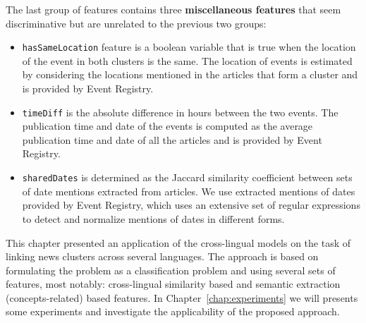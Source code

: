 The last group of features contains three {\bf miscellaneous features} that seem
discriminative but are unrelated to the previous two groups:
\begin{itemize}
\item \texttt{hasSameLocation} feature is a boolean variable that is true when the location of the event
in both clusters is the same. The location of events is estimated by considering the locations mentioned
in the articles that form a cluster and is provided by Event Registry.
\item \texttt{timeDiff} is the absolute difference in hours between the two events. The publication time
and date of the events is computed as the average publication time and date of all the articles and is
provided by Event Registry.
\item \texttt{sharedDates} is determined as the Jaccard similarity coefficient between sets of date
mentions extracted from articles. We use extracted mentions of dates provided by Event Registry, which
uses an extensive set of regular expressions to detect and normalize mentions of dates in different forms.
\end{itemize}

\vspace{5mm}
This chapter presented an application of the cross-lingual models on the task of linking news clusters across several
languages. The approach is based on formulating the problem as a classification problem and using several sets of
features, most notably: cross-lingual similarity based and semantic extraction (concepts-related) based features.
In Chapter~\ref{chap:experiments} we will presents some experiments and investigate the applicability of the proposed approach. 